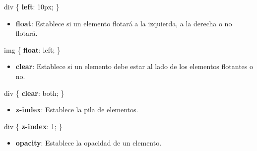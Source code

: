 \documentclass[
  a4paper,
  DIV=11,
  numbers=noendperiod,
  onepage,
  openany]{scrreprt}
\newenvironment{Shaded}{\begin{snugshade}}{\end{snugshade}}
\newcommand{\CharTok}[1]{\textcolor[rgb]{0.13,0.47,0.30}{#1}}
\newcommand{\DataTypeTok}[1]{\textcolor[rgb]{0.68,0.00,0.00}{#1}}
\newcommand{\DecValTok}[1]{\textcolor[rgb]{0.68,0.00,0.00}{#1}}
\newcommand{\KeywordTok}[1]{\textcolor[rgb]{0.00,0.23,0.31}{\textbf{#1}}}
\newcommand{\NormalTok}[1]{\textcolor[rgb]{0.00,0.23,0.31}{#1}}
\newcommand{\OperatorTok}[1]{\textcolor[rgb]{0.37,0.37,0.37}{#1}}
\providecommand{\tightlist}{%
  \setlength{\itemsep}{0pt}\setlength{\parskip}{0pt}}\usepackage{longtable,booktabs,array}
\begin{document}
\begin{tcolorbox}
\begin{Shaded}
\begin{Highlighting}[]
\NormalTok{div \{}
  \KeywordTok{left}\CharTok{:} \DecValTok{10}\DataTypeTok{px}\OperatorTok{;}
\NormalTok{\}}
\end{Highlighting}
\end{Shaded}

\begin{itemize}
\tightlist
\item
  \textbf{float}: Establece si un elemento flotará a la izquierda, a la
  derecha o no flotará.
\end{itemize}

\begin{Shaded}
\begin{Highlighting}[]
\NormalTok{img \{}
  \KeywordTok{float}\CharTok{:} \DecValTok{left}\OperatorTok{;}
\NormalTok{\}}
\end{Highlighting}
\end{Shaded}

\begin{itemize}
\tightlist
\item
  \textbf{clear}: Establece si un elemento debe estar al lado de los
  elementos flotantes o no.
\end{itemize}

\begin{Shaded}
\begin{Highlighting}[]
\NormalTok{div \{}
  \KeywordTok{clear}\CharTok{:} \DecValTok{both}\OperatorTok{;}
\NormalTok{\}}
\end{Highlighting}
\end{Shaded}

\begin{itemize}
\tightlist
\item
  \textbf{z-index}: Establece la pila de elementos.
\end{itemize}

\begin{Shaded}
\begin{Highlighting}[]
\NormalTok{div \{}
  \KeywordTok{z{-}index}\CharTok{:} \DecValTok{1}\OperatorTok{;}
\NormalTok{\}}
\end{Highlighting}
\end{Shaded}

\begin{itemize}
\tightlist
\item
  \textbf{opacity}: Establece la opacidad de un elemento.
\end{itemize}


\end{tcolorbox}
\end{document}
